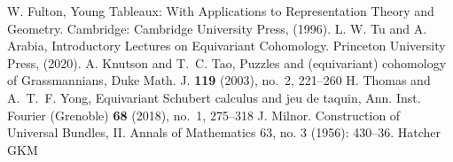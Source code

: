 \begin{thebibliography}{99}
  
   W. Fulton, Young Tableaux: With Applications to Representation Theory and Geometry. Cambridge: Cambridge University Press, (1996).
   L. W. Tu and A. Arabia, Introductory Lectures on Equivariant Cohomology. Princeton University Press, (2020).
   A. Knutson and T.~C. Tao, Puzzles and (equivariant) cohomology of Grassmannians, Duke Math. J. {\bf 119} (2003), no.~2, 221--260 
   H. Thomas and A.~T.~F. Yong, Equivariant Schubert calculus and jeu de taquin, Ann. Inst. Fourier (Grenoble) {\bf 68} (2018), no.~1, 275--318
   J. Milnor. Construction of Universal Bundles, II. Annals of Mathematics 63, no. 3 (1956): 430–36.
   Hatcher
   GKM

\end{thebibliography}